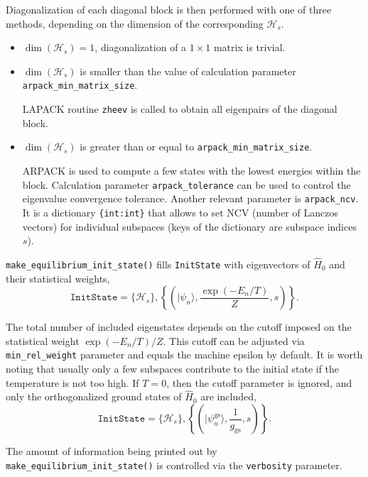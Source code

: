 \documentclass[]{article}
\newcommand{\ket}[1]{\ensuremath{|#1\rangle}}
\begin{document}
Diagonalization of each diagonal block is then performed with one of three
methods, depending on the dimension of the corresponding $\mathcal{H}_s$.
\begin{itemize}
    \item $\dim(\mathcal{H}_s) = 1$, diagonalization of a $1\times1$ matrix is trivial.
    \item $\dim(\mathcal{H}_s)$ is smaller than the value of calculation parameter \texttt{arpack\_min\_matrix\_size}.

    LAPACK routine \texttt{zheev} is called to obtain all eigenpairs of the diagonal block.

    \item $\dim(\mathcal{H}_s)$ is greater than or equal to \texttt{arpack\_min\_matrix\_size}.

    ARPACK is used to compute a few states with the lowest energies within
    the block. Calculation parameter \texttt{arpack\_tolerance} can be used
    to control the eigenvalue convergence tolerance. Another relevant parameter
    is \texttt{arpack\_ncv}. It is a dictionary \texttt{\{int:int\}} that allows to set NCV (number of Lanczos vectors) for individual subspaces (keys of the dictionary are subspace indices $s$).
\end{itemize}

\texttt{make\_equilibrium\_init\_state()} fills \texttt{InitState} with
eigenvectors of $\hat H_0$ and their statistical weights,
\begin{equation}
    \mathtt{InitState} = \{\mathcal{H}_s\},
    \left\{\left(\ket{\psi_n}, \frac{\exp(-E_n/T)}{Z}, s\right)\right\}.
\end{equation}

The total number of included eigenstates depends on the cutoff imposed on
the statistical weight $\exp(-E_n/T)/Z$. This cutoff can be adjusted via
\texttt{min\_rel\_weight} parameter and equals the machine epsilon by default.
It is worth noting that usually only a few subspaces contribute to the
initial state if the temperature is not too high. If $T=0$, then the cutoff
parameter is ignored, and only the orthogonalized ground states of $\hat H_0$ are included,
\begin{equation}
    \mathtt{InitState} = \{\mathcal{H}_s\},
    \left\{\left(\ket{\psi^\mathrm{gs}_n}, \frac{1}{g_\mathrm{gs}}, s\right)\right\}.
\end{equation}


The amount of information being printed out by \texttt{make\_equilibrium\_init\_state()} is controlled via the \texttt{verbosity} parameter.
\end{document}
